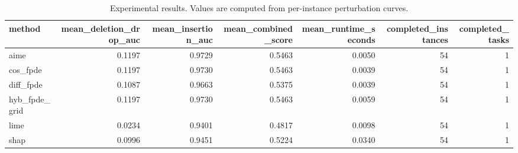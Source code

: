 \begin{table}[t]
\caption{Experimental results. Values are computed from per-instance perturbation curves.}
\label{tab:main_results_computed}
\centering
\begin{tabular}{lrrrrrr}
\toprule
method & mean\_deletion\_drop\_auc & mean\_insertion\_auc & mean\_combined\_score & mean\_runtime\_seconds & completed\_instances & completed\_tasks \\
\midrule
aime & 0.1197 & 0.9729 & 0.5463 & 0.0050 & 54 & 1 \\
cos\_fpde & 0.1197 & 0.9730 & 0.5463 & 0.0039 & 54 & 1 \\
diff\_fpde & 0.1087 & 0.9663 & 0.5375 & 0.0039 & 54 & 1 \\
hyb\_fpde\_grid & 0.1197 & 0.9730 & 0.5463 & 0.0059 & 54 & 1 \\
lime & 0.0234 & 0.9401 & 0.4817 & 0.0098 & 54 & 1 \\
shap & 0.0996 & 0.9451 & 0.5224 & 0.0340 & 54 & 1 \\
\bottomrule
\end{tabular}

\end{table}
